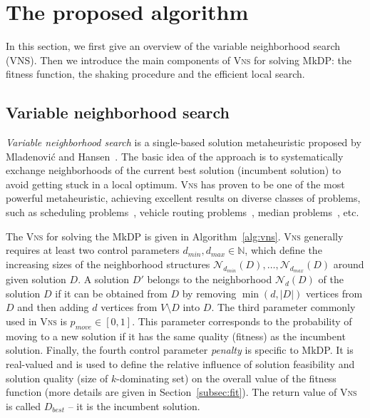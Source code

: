 \documentclass[dvipsnames,format=sigconf]{acmart} %
\begin{document}
   
\section{The proposed algorithm}\label{sec:vns}

In this section, we first give an overview of the variable neighborhood search (VNS). Then we introduce the main components of \textsc{Vns} for solving MkDP: the fitness function, the shaking procedure and the efficient local search.
 
  \subsection{Variable neighborhood search}
 \emph{Variable neighborhood search} is a single-based solution metaheuristic proposed by Mladenović and Hansen~\cite{mladenovic1997variable}. The basic idea of the approach is to systematically exchange neighborhoods of the current best solution (incumbent solution) to avoid getting stuck in a local optimum. \textsc{Vns} has proven to be one of the most powerful metaheuristic, achieving excellent results on diverse classes of problems, such as scheduling problems~\cite{fleszar2004solving}, vehicle routing problems~\cite{rezgui2019application}, median problems~\cite{herran2019variable}, etc.  
  
 The \textsc{Vns} for solving the MkDP is given in Algorithm~\ref{alg:vns}. \textsc{Vns} generally requires at least two control parameters $d_{min}, d_{max} \in \mathbb{N}$, which define the increasing sizes of the neighborhood structures $\mathcal{N}_{d_{min}}(D), \ldots, \mathcal{N}_{d_{max}}(D)$ around given solution $D$. A solution $D'$ belongs to the neighborhood $\mathcal{N}_{d}(D)$ of the solution $D$ if it can be obtained from $D$ by removing $\min(d, |D|)$ vertices from $D$ and then adding $d$ vertices from $V \setminus D$ into $D$. The third parameter commonly used in \textsc{Vns} is $p_{move} \in [0, 1]$. This parameter corresponds to the probability of moving to a new solution if it has the same quality (fitness) as the incumbent solution. Finally, the fourth control parameter \emph{penalty} is specific to MkDP. It is real-valued and is used to define the relative influence of solution feasibility and solution quality (size of $k$-dominating set) on the overall value of the fitness function (more details are given in Section~\ref{subsec:fit}).
 The return value of \textsc{Vns} is called $D_{best}$ -- it is the incumbent solution. 
  
\end{document}
